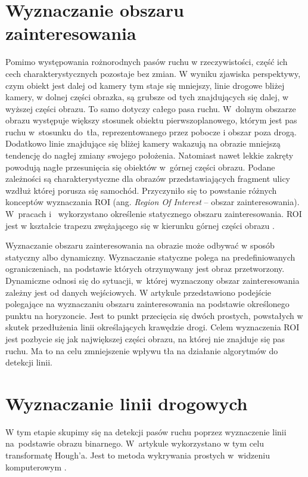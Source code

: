 \section{Wyznaczanie obszaru zainteresowania}
Pomimo występowania rożnorodnych pasów ruchu w rzeczywistości, część ich cech charakterystycznych pozostaje bez zmian.
W wyniku zjawiska perspektywy, czym obiekt jest dalej od kamery tym staje się mniejszy, linie drogowe bliżej kamery, w dolnej części obrazka, są grubsze od tych znajdujących się dalej, w wyższej części obrazu.
To samo dotyczy całego pasa ruchu. W~dolnym obszarze obrazu występuje większy stosunek obiektu pierwszoplanowego, którym jest pas ruchu w~stosunku do~tła, reprezentowanego przez pobocze i obszar poza drogą.
Dodatkowo linie znajdujące się bliżej kamery wakazują na obrazie mniejszą tendencję do nagłej zmiany swojego położenia.
Natomiast nawet lekkie zakręty powodują nagłe przesunięcia się obiektów w~górnej części obrazu.
Podane zależności są charakterystyczne dla obrazów przedstawiających fragment ulicy wzdłuż której porusza się samochód.
Przyczyniło się to powstanie różnych konceptów wyznaczania ROI (ang. \textit{Region Of Interest} -- obszar zainteresowania).
W~pracach \cite{2} i~\cite{4} wykorzystano określenie statycznego obszaru zainteresowania.
ROI jest w kształcie trapezu zwężającego się w kierunku górnej części obrazu \cite{4}.

Wyznaczanie obszaru zainteresowania na obrazie może odbywać w sposób statyczny albo dynamiczny. 
Wyznaczanie statyczne polega na predefiniowanych ograniczeniach, na podstawie których otrzymywany jest obraz przetworzony. 
Dynamiczne odnosi się do sytuacji, w~której wyznaczony obszar zainteresowania zależny jest od danych wejściowych. 
W artykule \cite{vanishing_point} przedstawiono podejście polegające na wyznaczaniu obszaru zainteresowania na podstawie określonego punktu na horyzoncie.
Jest to punkt przecięcia się dwóch prostych, powstałych w skutek przedłużenia linii określających krawędzie drogi. 
Celem wyznaczenia ROI jest pozbycie się jak największej części obrazu, na której nie znajduje się pas ruchu.
Ma to na celu zmniejszenie wpływu tła na działanie algorytmów do detekcji linii.

\section{Wyznaczanie linii drogowych}
W tym etapie skupimy się na detekcji pasów ruchu poprzez wyznaczenie linii na~podstawie obrazu binarnego. 
W~artykule \cite{reichenbach_comparison} wykorzystano w tym celu transformatę Hough'a. 
Jest to metoda wykrywania prostych w~widzeniu komputerowym \cite{hough}.

